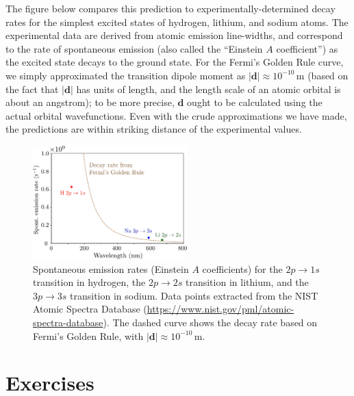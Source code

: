 \documentclass[pra,12pt]{revtex4}
\begin{document}
The figure below compares this prediction to experimentally-determined
decay rates for the simplest excited states of hydrogen, lithium, and
sodium atoms.  The experimental data are derived from atomic emission
line-widths, and correspond to the rate of spontaneous emission (also
called the ``Einstein $A$ coefficient'') as the excited state decays
to the ground state.  For the Fermi's Golden Rule curve, we simply
approximated the transition dipole moment as $|\mathbf{d}| \approx
10^{-10}\,\mathrm{m}$ (based on the fact that $|\mathbf{d}|$ has units
of length, and the length scale of an atomic orbital is about an
angstrom); to be more precise, $\mathbf{d}$ ought to be calculated
using the actual orbital wavefunctions.  Even with the crude
approximations we have made, the predictions are within striking
distance of the experimental values.

\begin{figure}[h]
  \centering\includegraphics[width=0.53\textwidth]{emissionrates}
  \caption{Spontaneous emission rates (Einstein $A$ coefficients) for
    the $2p\rightarrow 1s$ transition in hydrogen, the
    $2p\rightarrow2s$ transition in lithium, and the $3p\rightarrow3s$
    transition in sodium.  Data points extracted from the NIST Atomic
    Spectra Database
    (\href{https://www.nist.gov/pml/atomic-spectra-database}{https://www.nist.gov/pml/atomic-spectra-database}).
    The dashed curve shows the decay rate based on Fermi's Golden
    Rule, with $|\mathbf{d}| \approx 10^{-10}\,\mathrm{m}$.  }
\end{figure}


\section*{Exercises}
\end{document}
